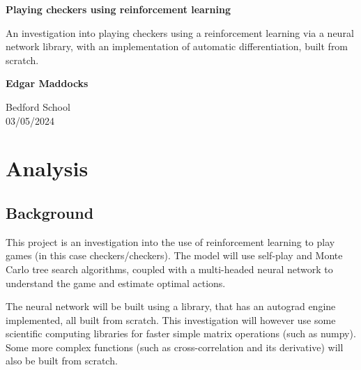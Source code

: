 \documentclass{article}
\begin{document}
    \dosecttoc

    \begin{titlepage}
        \begin{center}
            \vspace*{1cm}
                
            \Huge
            \textbf{Playing checkers using reinforcement learning}
                
            \vspace{0.5cm}
            \LARGE
            An investigation into playing checkers using a reinforcement learning via a neural network library, with an implementation of
            automatic differentiation, built from scratch.
                
            \vspace{1.5cm}
                
            \textbf{Edgar Maddocks}            
            \vfill
                
            \vspace{0.8cm}
                            
            \Large
            Bedford School\\
            03/05/2024\\
                
        \end{center}
    \end{titlepage}

    \pagebreak
    \tableofcontents

    \section{Analysis}
    \subsection{Background}
    This project is an investigation into the use of reinforcement learning to play games (in this case checkers/checkers).
    The model will use self-play and Monte Carlo tree search algorithms, coupled with a multi-headed neural network to
    understand the game and estimate optimal actions.

    The neural network will be built using a library, that has an autograd engine implemented, all built from scratch. This
    investigation will however use some scientific computing libraries for faster simple matrix operations (such as numpy). Some more
    complex functions (such as cross-correlation and its derivative) will also be built from scratch.
\end{document}
